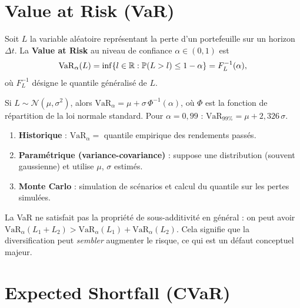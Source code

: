 \section{Value at Risk (VaR)}

\begin{definition}
Soit $L$ la variable al\'eatoire repr\'esentant la perte d'un portefeuille sur
un horizon $\Delta t$. La \textbf{Value at Risk} au niveau de
confiance $\alpha \in (0, 1)$ est
\[
    \mathrm{VaR}_\alpha(L) = \inf\{l \in \mathbb{R} : \mathbb{P}(L > l) \leq 1 - \alpha\}
    = F_L^{-1}(\alpha),
\]
o\`u $F_L^{-1}$ d\'esigne le quantile g\'en\'eralis\'e de $L$.
\end{definition}

\begin{exemple}
Si $L \sim \mathcal{N}(\mu, \sigma^2)$, alors
$\mathrm{VaR}_\alpha = \mu + \sigma\,\Phi^{-1}(\alpha)$,
o\`u $\Phi$ est la fonction de r\'epartition de la loi normale standard.
Pour $\alpha = 0{,}99$ : $\mathrm{VaR}_{99\%} = \mu + 2{,}326\,\sigma$.
\end{exemple}

\begin{proposition}
\begin{enumerate}
    \item \textbf{Historique} : $\mathrm{VaR}_\alpha = $ quantile empirique
    des rendements pass\'es.
    \item \textbf{Param\'etrique (variance-covariance)} : suppose une
    distribution (souvent gaussienne) et utilise $\mu$, $\sigma$ estim\'es.
    \item \textbf{Monte Carlo} : simulation de sc\'enarios et calcul du
    quantile sur les pertes simul\'ees.
\end{enumerate}
\end{proposition}

\begin{attention}[title=\textbf{Limites de la VaR}]
La VaR ne satisfait pas la propri\'et\'e de sous-additivit\'e en g\'en\'eral :
on peut avoir $\mathrm{VaR}_\alpha(L_1 + L_2) > \mathrm{VaR}_\alpha(L_1) +
\mathrm{VaR}_\alpha(L_2)$. Cela signifie que la diversification peut
\emph{sembler} augmenter le risque, ce qui est un d\'efaut conceptuel majeur.
\end{attention}

\section{Expected Shortfall (CVaR)}

